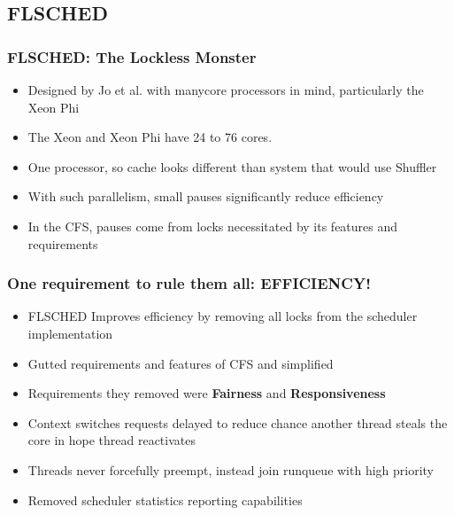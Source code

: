 \documentclass{beamer}
\newcommand{\linespace}{\vskip 0.25cm}
\begin{document}
\subsection{FLSCHED}
\begin{frame}
\frametitle{FLSCHED: The Lockless Monster}

\begin{itemize}
	\item Designed by Jo et al. with manycore processors in mind, particularly the Xeon Phi


\linespace

\item The Xeon and Xeon Phi have 24 to 76 cores.
\linespace
\item One processor, so cache looks different than system that would use Shuffler
\linespace
\item With such parallelism, small pauses significantly reduce efficiency
\linespace

\item In the CFS, pauses come from locks necessitated by its features and requirements

\end{itemize}
\end{frame}

\begin{frame}
\frametitle{One requirement to rule them all: EFFICIENCY!}

\begin{itemize}
\item FLSCHED Improves efficiency by removing all locks from the scheduler implementation

\item Gutted requirements and features of CFS and simplified
\linespace

\item Requirements they removed were \textbf{Fairness} and \textbf{Responsiveness}

\item Context switches requests delayed to reduce chance another thread steals the core in hope thread reactivates

\item Threads never forcefully preempt, instead join runqueue with high priority

\item Removed scheduler statistics reporting capabilities

\end{itemize}
\end{frame}
\end{document}
